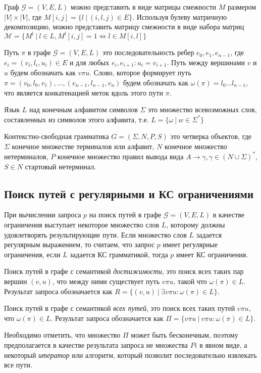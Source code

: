 \documentclass[14pt]{matmex-diploma-custom}
\begin{document}
Граф $\mathcal{G} = (V, E, L)$ можно представить в виде матрицы смежности $M$ размером $|V| \times |V|$, где $M[i,j] = \{l~|~(i,l,j) \in E\}$. Используя булеву матричную декомпозицию, можно представить матрицу смежности в виде набора матриц $\mathcal{M} = \{ M^l ~|~ l \in L, M^l[i,j] = 1 \iff l \in M[i,l]\}$ 

Путь $\pi$ в графе $\mathcal{G} = (V, E, L)$ это последовательность ребер $e_0,e_1,e_{n-1}$, где $e_i = (v_i, l_i, u_i) \in E$ и для любых $e_i, e_{i+1}: u_i = v_{i+1}$. Путь между вершинами $v$ и $u$ будем обозначать как $v \pi u$. Слово, которое формирует путь $\pi = (v_0, l_0, v_1), ... ,(v_{n-1}, l_{n-1}, v_n)$ будем обозначать как $\omega (\pi) = l_0 ... l_{n-1}$, что является конкатенацией меток вдоль этого пути $\pi$.

Язык $L$ над конечным алфавитом символов $\Sigma$ это множество всевозможных слов, составленных из символов этого алфавита, т.е. $L = \{\omega~|~w \in \Sigma ^*\}$

Контекстно-свободная грамматика $G = (\Sigma, N, P, S)$ это четверка объектов, где $\Sigma$ конечное множестве терминалов или алфавит, $N$ конечное множество нетерминалов, $P$ конечное множество правил вывода вида $A \rightarrow \gamma, \gamma \in (N \cup \Sigma)^*$, $S \in N$ стартовый нетерминал. 

\subsection{Поиск путей с регулярными и КС ограничениями}

При вычислении запроса $p$ на поиск путей в графе $\mathcal{G} = (V, E, L)$ в качестве ограничения выступает некоторое множество слов $L$, которому должны удовлетворять результирующие пути. Если множество слов $L$ задается регулярным выражением, то считаем, что запрос $p$ имеет регулярные ограничения, если $L$ задается КС грамматикой, тогда $p$ имеет КС ограничения.

Поиск путей в графе с семантикой \textit{достижимости}, это поиск всех таких пар вершин $(v,u)$, что между ними существует путь $v \pi u$, такой что $\omega (\pi) \in L$. Результат запроса обозначается как $R = \{ (v,u)~|~\exists v \pi u : \omega (\pi) \in L \}$.

Поиск путей в графе с семантикой \textit{всех путей}, это поиск всех таких путей $v \pi u$,   что $\omega (\pi) \in L$. Результат запроса обозначается как $\Pi = \{ v \pi u~|~v \pi u : \omega (\pi) \in L \}$.

Необходимо отметить, что множество $\Pi$ может быть бесконечным, поэтому предполагается в качестве результата запроса не множества $Pi$ в явном виде, а некоторый \textit{итератор} или алгоритм, который позволит последовательно извлекать все пути.
\end{document}
